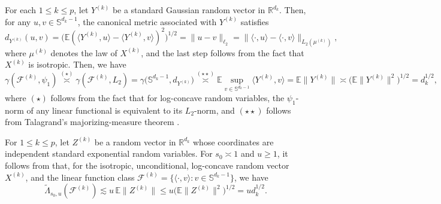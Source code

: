 \documentclass[numbers,webpdf,imaiai]{ima-authoring-template}
\theoremstyle{thmstyletwo}%
\numberwithin{equation}{section}
\numberwithin{equation}{section}
\providecommand{\mathbbm}{\mathbb} %
\newcommand{\R}{\mathbbm{R}}
\newcommand{\F}{\mathcal{F}}
\newcommand{\E}{\mathbb{E}}
\renewcommand{\S}{\mathbb{S}}
\begin{document}
For each $1\le k\le p$, let $Y^{(k)}$ be a standard Gaussian random vector in $\R^{d_k}$. Then, for any $u, v \in \S^{d_k-1}$, the canonical metric associated with $Y^{(k)}$ satisfies
\[
d_{Y^{(k)}}(u, v)
= \big(\mathbb{E}(\langle Y^{(k)}, u\rangle-\langle Y^{(k)}, v\rangle)^2\big)^{1/2}=\|u-v\|_{\ell_2}
=\|\langle\cdot, u\rangle-\langle\cdot, v\rangle\|_{L_2(\mu^{(k)})},
\]
where $\mu^{(k)}$ denotes the law of $X^{(k)}$, and the last step follows from the fact that $X^{(k)}$ is isotropic. Then, we have
\[
\gamma(\mathcal{F}^{(k)}, \psi_1)\overset{\text{$(\star)$}}{\asymp}\gamma(\mathcal{F}^{(k)}, L_2)=\gamma\big(\S^{d_k-1}, d_{Y^{(k)}}\big) \overset{\text{$(\star\star)$}}{\asymp} \mathbb{E} \sup _{v \in \S^{d_k-1}}\langle Y^{(k)}, v\rangle = \E \|Y^{(k)}\| \asymp \big(\E \|Y^{(k)}\|^2\big)^{1/2}=d_k^{1/2},
\]
where $(\star)$ follows from the fact that for log-concave random variables, the $\psi_1$-norm of any linear functional is equivalent to its $L_2$-norm, and $(\star\star)$ follows from Talagrand's majorizing-measure theorem \cite[Theorem 2.10.1]{talagrand2022upper}.

For $1\le k\le p$, let $Z^{(k)}$ be a random vector in $\R^{d_k}$ whose coordinates are independent standard exponential random variables. For $s_0\asymp 1$ and $u\ge 1$, it follows from \cite[Section 4.3]{mendelson2016upper} that, for the isotropic, unconditional, log-concave random vector $X^{(k)}$, and the linear function class $\F^{(k)}=\{\langle \cdot,v \rangle: v\in \S^{d_k-1} \}$, we have
\[
\widetilde{\Lambda}_{s_0,u}(\F^{(k)})\lesssim u\,\E \|Z^{(k)}\|\le u\big(\E \|Z^{(k)}\|^2 \big)^{1/2}=ud_k^{1/2}.
\]
\end{document}
